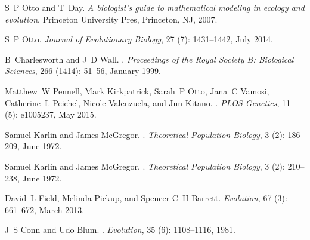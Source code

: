 \begin{thebibliography}{63}
S~P Otto and T~Day.
\newblock \emph{{A biologist's guide to mathematical modeling in ecology and
  evolution}}.
\newblock Princeton University Pres, Princeton, NJ, 2007.

S~P Otto.
\newblock \emph{Journal of Evolutionary Biology}, 27 (7):
  1431--1442, July 2014.

B~Charlesworth and J~D Wall.
.
\newblock \emph{Proceedings of the Royal Society B: Biological Sciences},
  266 (1414): 51--56, January 1999.

Matthew~W Pennell, Mark Kirkpatrick, Sarah~P Otto, Jana~C Vamosi, Catherine~L
  Peichel, Nicole Valenzuela, and Jun Kitano.
.
\newblock \emph{PLOS Genetics}, 11 (5): e1005237, May 2015.

Samuel Karlin and James McGregor.
.
\newblock \emph{Theoretical Population Biology}, 3 (2):
  186--209, June 1972{}.

Samuel Karlin and James McGregor.
.
\newblock \emph{Theoretical Population Biology}, 3 (2):
  210--238, June 1972{}.

David~L Field, Melinda Pickup, and Spencer C~H Barrett.
\newblock \emph{Evolution}, 67 (3): 661--672, March 2013.

J~S Conn and Udo Blum.
.
\newblock \emph{Evolution}, 35 (6): 1108--1116, 1981.


\end{thebibliography}
